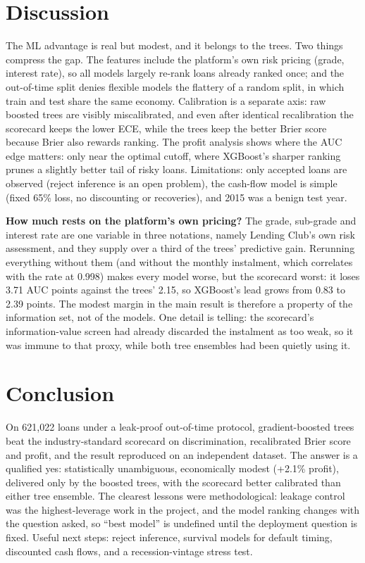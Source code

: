 \documentclass[a4paper,twocolumn,10pt]{article}
\begin{document}
\section{Discussion}
The ML advantage is real but modest, and it belongs to the trees. Two things compress the gap. The features include the platform's own risk pricing (grade, interest rate), so all models largely re-rank loans already ranked once; and the out-of-time split denies flexible models the flattery of a random split, in which train and test share the same economy. Calibration is a separate axis: raw boosted trees are visibly miscalibrated, and even after identical recalibration the scorecard keeps the lower ECE, while the trees keep the better Brier score because Brier also rewards ranking. The profit analysis shows where the AUC edge matters: only near the optimal cutoff, where XGBoost's sharper ranking prunes a slightly better tail of risky loans. Limitations: only accepted loans are observed (reject inference is an open problem), the cash-flow model is simple (fixed 65\% loss, no discounting or recoveries), and 2015 was a benign test year.

\textbf{How much rests on the platform's own pricing?} The grade, sub-grade and interest rate are one variable in three notations, namely Lending Club's own risk assessment, and they supply over a third of the trees' predictive gain. Rerunning everything without them (and without the monthly instalment, which correlates with the rate at 0.998) makes every model worse, but the scorecard worst: it loses 3.71 AUC points against the trees' 2.15, so XGBoost's lead grows from 0.83 to 2.39 points. The modest margin in the main result is therefore a property of the information set, not of the models. One detail is telling: the scorecard's information-value screen had already discarded the instalment as too weak, so it was immune to that proxy, while both tree ensembles had been quietly using it.

\section{Conclusion}
On 621{,}022 loans under a leak-proof out-of-time protocol, gradient-boosted trees beat the industry-standard scorecard on discrimination, recalibrated Brier score and profit, and the result reproduced on an independent dataset. The answer is a qualified yes: statistically unambiguous, economically modest (+2.1\% profit), delivered only by the boosted trees, with the scorecard better calibrated than either tree ensemble. The clearest lessons were methodological: leakage control was the highest-leverage work in the project, and the model ranking changes with the question asked, so ``best model'' is undefined until the deployment question is fixed. Useful next steps: reject inference, survival models for default timing, discounted cash flows, and a recession-vintage stress test.
\end{document}
